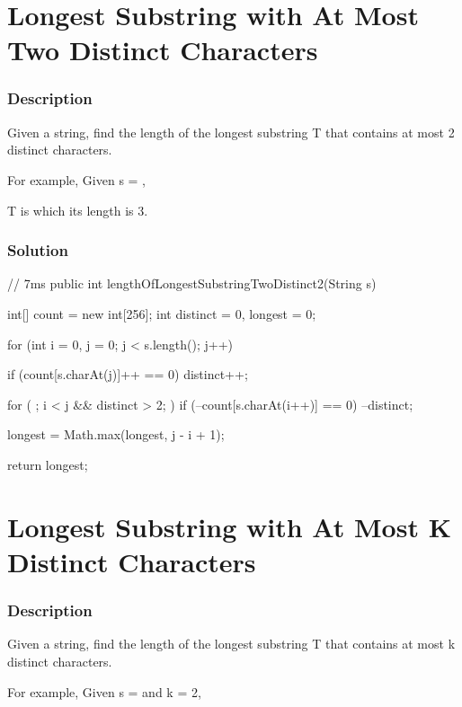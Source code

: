 \newpage

\section{Longest Substring with At Most Two Distinct Characters} %

\subsubsection{Description}
Given a string, find the length of the longest substring T that contains at most 2 distinct characters.

For example, Given s = ,

T is  which its length is 3.

\subsubsection{Solution}

\begin{Code}
// 7ms
public int lengthOfLongestSubstringTwoDistinct2(String s) {
    int[] count = new int[256];
    int distinct = 0, longest = 0;

    for (int i = 0, j = 0; j < s.length(); j++) {
        if (count[s.charAt(j)]++ == 0) {
            distinct++;
        }

        for ( ; i < j && distinct > 2; ) {
            if (--count[s.charAt(i++)] == 0) {
                --distinct;
            }
        }

        longest = Math.max(longest, j - i + 1);
    }

    return longest;
}
\end{Code}

\newpage

\section{Longest Substring with At Most K Distinct Characters} %

\subsubsection{Description}
Given a string, find the length of the longest substring T that contains at most k distinct characters.

For example, Given s =  and k = 2,

